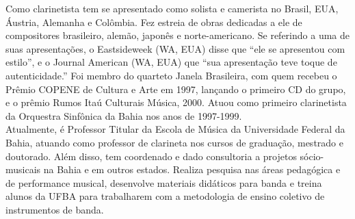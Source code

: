 Como clarinetista tem se apresentado como solista e camerista no
Brasil, EUA, Áustria, Alemanha e Colômbia. Fez estreia de obras
dedicadas a ele de compositores brasileiro, alemão, japonês e
norte-americano. Se referindo a uma de suas apresentações, o
Eastsideweek (WA, EUA) disse que ``ele se apresentou com estilo'', e o
Journal American (WA, EUA) que ``sua apresentação teve toque de
autenticidade.''  Foi membro do quarteto Janela Brasileira, com quem
recebeu o Prêmio COPENE de Cultura e Arte em 1997, lançando o primeiro
CD do grupo, e o prêmio Rumos Itaú Culturais Música, 2000. Atuou como
primeiro clarinetista da Orquestra Sinfônica da Bahia nos anos de
1997-1999.  \\


Atualmente, é Professor Titular da Escola de Música da Universidade
Federal da Bahia, atuando como professor de clarineta nos cursos de
graduação, mestrado e doutorado. Além disso, tem coordenado e dado
consultoria a projetos sócio-musicais na Bahia e em outros
estados. Realiza pesquisa nas áreas pedagógica e de performance
musical, desenvolve materiais didáticos para banda e treina alunos da
UFBA para trabalharem com a metodologia de ensino coletivo de
instrumentos de banda.

